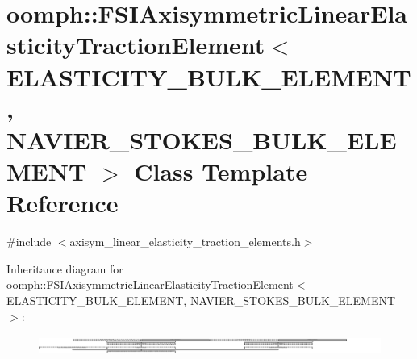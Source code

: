 \hypertarget{classoomph_1_1FSIAxisymmetricLinearElasticityTractionElement}{}\section{oomph\+:\+:F\+S\+I\+Axisymmetric\+Linear\+Elasticity\+Traction\+Element$<$ E\+L\+A\+S\+T\+I\+C\+I\+T\+Y\+\_\+\+B\+U\+L\+K\+\_\+\+E\+L\+E\+M\+E\+NT, N\+A\+V\+I\+E\+R\+\_\+\+S\+T\+O\+K\+E\+S\+\_\+\+B\+U\+L\+K\+\_\+\+E\+L\+E\+M\+E\+NT $>$ Class Template Reference}
\label{classoomph_1_1FSIAxisymmetricLinearElasticityTractionElement}


{\ttfamily \#include $<$axisym\+\_\+linear\+\_\+elasticity\+\_\+traction\+\_\+elements.\+h$>$}

Inheritance diagram for oomph\+:\+:F\+S\+I\+Axisymmetric\+Linear\+Elasticity\+Traction\+Element$<$ E\+L\+A\+S\+T\+I\+C\+I\+T\+Y\+\_\+\+B\+U\+L\+K\+\_\+\+E\+L\+E\+M\+E\+NT, N\+A\+V\+I\+E\+R\+\_\+\+S\+T\+O\+K\+E\+S\+\_\+\+B\+U\+L\+K\+\_\+\+E\+L\+E\+M\+E\+NT $>$\+:\begin{figure}[H]
\begin{center}
\leavevmode
\includegraphics[height=0.602961cm]{classoomph_1_1FSIAxisymmetricLinearElasticityTractionElement}
\end{center}
\end{figure}
